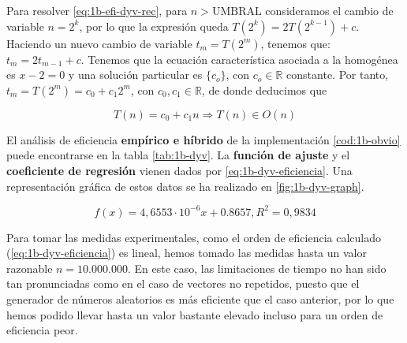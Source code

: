 Para resolver \ref{eq:1b-efi-dyv-rec}, para $n > \text{UMBRAL}$
consideramos el cambio
de variable $n = 2^k$, por lo que la expresión queda $T(2^k) = 2T(2^{k-1}) + c$. Haciendo
un nuevo cambio de variable $t_m = T(2^m)$, tenemos que:
$t_m = 2 t_{m-1} + c$. Tenemos que la ecuación característica
asociada a la homogénea es $x-2 = 0$ y una solución particular 
es $\{c_o\}$, con $c_o \in \mathbb R$ constante. Por tanto, $t_m = T(2^m) = c_0 + c_1 2^m$,
con $c_0, c_1 \in \mathbb R$, de donde deducimos que 

\begin{equation}
    T(n) = c_0 + c_1 n \Rightarrow \boxed{T(n) \in O(n)}
\end{equation}

El análisis de eficiencia \textbf{empírico e híbrido}
de la implementación \ref{cod:1b-obvio} puede encontrarse en la tabla \ref{tab:1b-dyv}. La 
\textbf{función de ajuste} y el \textbf{coeficiente de regresión} vienen dados 
por \ref{eq:1b-dyv-eficiencia}. Una representación gráfica de estos datos se ha realizado en
\ref{fig:1b-dyv-graph}. 

\begin{equation}
    \boxed{f(x) = 4,6553 \cdot 10^{-6} x + 0.8657, R^2 = 0,9834}
    \label{eq:1b-dyv-eficiencia}
\end{equation}

Para tomar las medidas experimentales, como el orden de eficiencia calculado 
(\ref{eq:1b-dyv-eficiencia}) es lineal, hemos tomado las medidas hasta 
un valor razonable $n=10.000.000$. En este caso, las limitaciones de tiempo
no han sido tan pronunciadas como en el caso de vectores no repetidos,
puesto que el generador de números aleatorios es más eficiente que el caso
anterior, por lo que hemos podido llevar hasta un valor bastante elevado 
incluso para un orden de eficiencia peor. 

